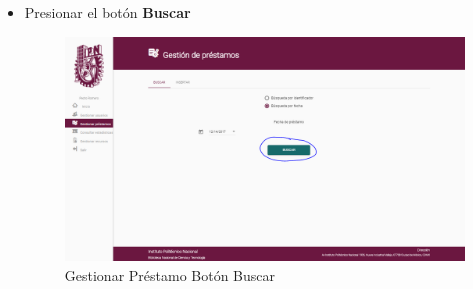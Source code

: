 \begin{itemize}
\begin{enumerate}
	\end{enumerate}
	\item Presionar el botón \textbf{Buscar}
	
	\begin{figure}[hbtp]
	\includegraphics[scale=0.3]{images/Interfaz/IUGS07_gestionarPrestamoBuscar.PNG}
	\caption{Gestionar Préstamo Botón Buscar}
	\end{figure}
\end{itemize}